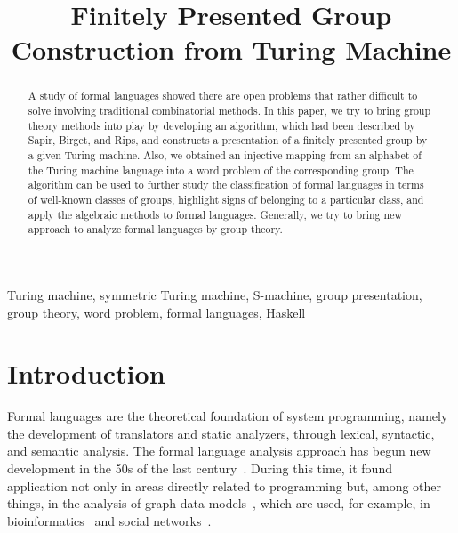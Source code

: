 \documentclass[conference]{IEEEtran}
\theoremstyle{definition}
\begin{document}
\title{Finitely Presented Group Construction from Turing Machine}

\author{
\and
{}
}

\maketitle

\begin{abstract}
A study of formal languages showed there are open problems that rather difficult to solve involving traditional combinatorial methods. In this paper, we try to bring group theory methods into play by developing an algorithm, which had been described by Sapir, Birget, and Rips, and constructs a presentation of a finitely presented group by a given Turing machine. Also, we obtained an injective mapping from an alphabet of the Turing machine language into a word problem of the corresponding group. The algorithm can be used to further study the classification of formal languages in terms of well-known classes of groups, highlight signs of belonging to a particular class, and apply the algebraic methods to formal languages. Generally, we try to bring new approach to analyze formal languages by group theory. 
\end{abstract}

\begin{IEEEkeywords}
Turing machine, symmetric Turing machine, S-machine, group presentation, group theory, word problem, formal languages, Haskell
\end{IEEEkeywords}

\section{Introduction}

Formal languages are the theoretical foundation of system programming, namely the development of translators and static analyzers, through lexical, syntactic, and semantic analysis.
The formal language analysis approach has begun new development in the 50s of the last century~\cite{chomsky1, chomsky2}.
During this time, it found application not only in areas directly related to programming but, among other things, in the analysis of graph data models~\cite{Hellings2015QueryingFP, Azimov}, which are used,
for example, in bioinformatics~\cite{Huber2007} and social networks~\cite{scott1988social}.
\end{document}
